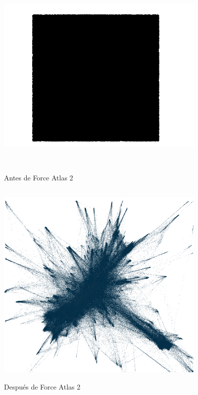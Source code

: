 \documentclass{sig-alternate-05-2015}
\begin{document}
\begin{figure}
\centering
\includegraphics[height=4in, width=4in]{gephibefore}
\caption{Antes de Force Atlas 2}
\end{figure}

\begin{figure}
\centering
\includegraphics[height=4in, width=4in]{gephiafter}
\caption{Después de Force Atlas 2}
\end{figure}
\end{document}
